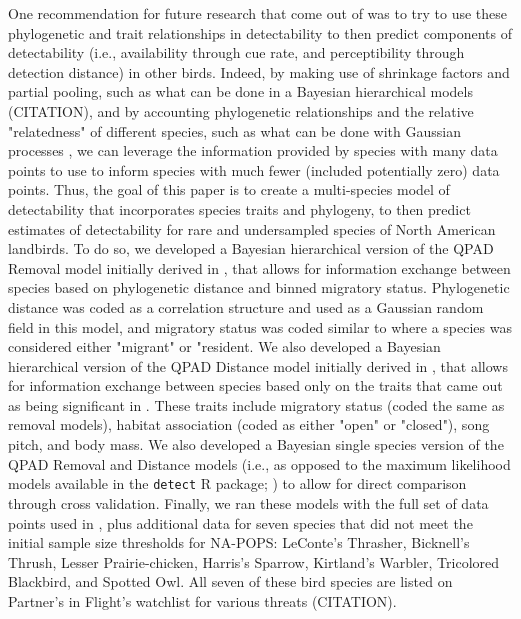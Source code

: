 \documentclass[12pt]{article}
\begin{document}
\par One recommendation for future research that come out of \cite{solymos_phylogeny_2018} was to try to use these phylogenetic and trait relationships in detectability to then predict components of detectability (i.e., availability through cue rate, and perceptibility through detection distance) in other birds.
Indeed, by making use of shrinkage factors and partial pooling, such as what can be done in a Bayesian hierarchical models (CITATION), and by accounting phylogenetic relationships and the relative "relatedness" of different species, such as what can be done with Gaussian processes \citep{bernardo_regression_1998, mcelreath_continous_2020}, we can leverage the information provided by species with many data points to use to inform species with much fewer (included potentially zero) data points.
Thus, the goal of this paper is to create a multi-species model of detectability that incorporates species traits and phylogeny, to then predict estimates of detectability for rare and undersampled species of North American landbirds.
To do so, we developed a Bayesian hierarchical version of the QPAD Removal model initially derived in \cite{solymos_calibrating_2013}, that allows for information exchange between species based on phylogenetic distance and binned migratory status.
Phylogenetic distance was coded as a correlation structure and used as a Gaussian random field in this model, and migratory status was coded similar to \cite{solymos_phylogeny_2018} where a species was considered either "migrant" or "resident.
We also developed a Bayesian hierarchical version of the QPAD Distance model initially derived in \cite{solymos_calibrating_2013}, that allows for information exchange between species based only on the traits that came out as being significant in \cite{solymos_phylogeny_2018}.
These traits include migratory status (coded the same as removal models), habitat association (coded as either "open" or "closed"), song pitch, and body mass.
We also developed a Bayesian single species version of the QPAD Removal and Distance models (i.e., as opposed to the maximum likelihood models available in the \texttt{detect} R package; \cite{solymos_detect_2020}) to allow for direct comparison through cross validation.
Finally, we ran these models with the full set of data points used in \cite{edwards_point_2023}, plus additional data for seven species that did not meet the initial sample size thresholds for NA-POPS: LeConte's Thrasher, Bicknell's Thrush, Lesser Prairie-chicken, Harris's Sparrow, Kirtland's Warbler, Tricolored Blackbird, and Spotted Owl. 
All seven of these bird species are listed on Partner's in Flight's watchlist for various threats (CITATION). 
\end{document}
